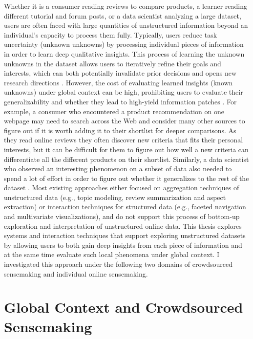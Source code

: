 \setul{3.6pt}{.1pt}

\setul{3.6pt}{.1pt}

Whether it is a consumer reading reviews to compare products, a learner reading different tutorial and forum posts, or a data scientist analyzing a large dataset, users are often faced with large quantities of unstructured information beyond an individual's capacity to process them fully. Typically, users reduce task uncertainty (unknown unknowns) by processing individual pieces of information in order to learn deep qualitative insights. This process of learning the unknown unknowns in the dataset allows users to iteratively refine their goals and interests, which can both potentially invalidate prior decisions and opens new research directions \cite{mar2006exp}. However, the cost of evaluating learned insights (known unknowns) under global context can be high, prohibiting users to evaluate their generalizability and whether they lead to high-yield information patches \cite{pirolli1999information}. For example, a consumer who encountered a product recommendation on one webpage may need to search across the Web and consider many other sources to figure out if it is worth adding it to their shortlist for deeper comparisons. As they read online reviews they often discover new criteria that fits their personal interests, but it can be difficult for them to figure out how well a new criteria can differentiate all the different products on their shortlist. Similarly, a data scientist who observed an interesting phenomenon on a subset of data also needed to spend a lot of effort in order to figure out whether it generalizes to the rest of the dataset \cite{charmaz2007grounded}.  Most existing approaches either focused on aggregation techniques of unstructured data (e.g., topic modeling, review summarization and aspect extraction) or interaction techniques for structured data (e.g., faceted navigation and multivariate visualizations), and do not support this process of bottom-up exploration and interpretation of unstructured online data. This thesis explores systems and interaction techniques that support exploring unstructured datasets by allowing users to both gain deep insights from each piece of information and at the same time evaluate such local phenomena under global context. I investigated this approach under the following two domains of crowdsourced sensemaking and individual online sensemaking.

\section{Global Context and Crowdsourced Sensemaking}

